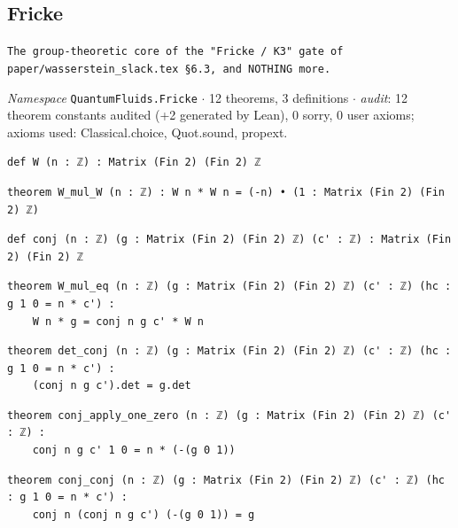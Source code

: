 \subsection{Fricke}\label{appA:Fricke}
{\footnotesize\raggedright\texttt{The group-\allowbreak{}theoretic core of the "Fricke /\allowbreak{} K3" gate of paper/\allowbreak{}wasserstein\_\allowbreak{}slack.\allowbreak{}tex §6.\allowbreak{}3,\allowbreak{} and NOTHING more.\allowbreak{}}\par}
{\footnotesize\raggedright\emph{Namespace} \texttt{QuantumFluids.\allowbreak{}Fricke} $\cdot$ 12 theorems, 3 definitions $\cdot$ \emph{audit}: 12 theorem constants audited (+2 generated by Lean), 0 sorry, 0 user axioms; axioms used: Classical.choice, Quot.sound, propext.\par}
\vspace{1pt}
\begin{lstlisting}[style=leancat]
def W (n : ℤ) : Matrix (Fin 2) (Fin 2) ℤ
\end{lstlisting}

\begin{lstlisting}[style=leancat]
theorem W_mul_W (n : ℤ) : W n * W n = (-n) • (1 : Matrix (Fin 2) (Fin 2) ℤ)
\end{lstlisting}

\begin{lstlisting}[style=leancat]
def conj (n : ℤ) (g : Matrix (Fin 2) (Fin 2) ℤ) (c' : ℤ) : Matrix (Fin 2) (Fin 2) ℤ
\end{lstlisting}

\begin{lstlisting}[style=leancat]
theorem W_mul_eq (n : ℤ) (g : Matrix (Fin 2) (Fin 2) ℤ) (c' : ℤ) (hc : g 1 0 = n * c') :
    W n * g = conj n g c' * W n
\end{lstlisting}

\begin{lstlisting}[style=leancat]
theorem det_conj (n : ℤ) (g : Matrix (Fin 2) (Fin 2) ℤ) (c' : ℤ) (hc : g 1 0 = n * c') :
    (conj n g c').det = g.det
\end{lstlisting}

\begin{lstlisting}[style=leancat]
theorem conj_apply_one_zero (n : ℤ) (g : Matrix (Fin 2) (Fin 2) ℤ) (c' : ℤ) :
    conj n g c' 1 0 = n * (-(g 0 1))
\end{lstlisting}

\begin{lstlisting}[style=leancat]
theorem conj_conj (n : ℤ) (g : Matrix (Fin 2) (Fin 2) ℤ) (c' : ℤ) (hc : g 1 0 = n * c') :
    conj n (conj n g c') (-(g 0 1)) = g
\end{lstlisting}

